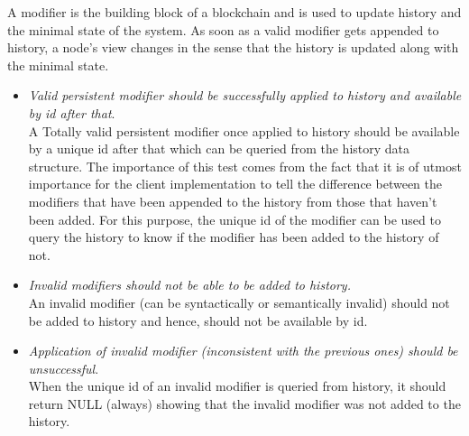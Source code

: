\begin{enumerate}[\IEEEsetlabelwidth{Z}]
A modifier is the building block of a blockchain and is used to update history and the minimal state of the system. As soon as a valid modifier gets appended to history, a node's view changes in the sense that the history is updated along with the minimal state.
\begin{itemize}[]
\item \textit{Valid persistent modifier should be successfully applied to history and available by id after that}.\\
A Totally valid persistent modifier once applied to history should be available by a unique id after that which can be queried from the history data structure. The importance of this test comes from the fact that it is of utmost importance for the client implementation to tell the difference between the modifiers that have been appended to the history from those that haven't been added. For this purpose, the unique id of the modifier can be used to query the history to know if the modifier has been added to the history of not.
\item \textit{Invalid modifiers should not be able to be added to history.}\\
An invalid modifier (can be syntactically or semantically invalid) should not be added to history and hence, should not be available by id.
\item \textit{Application of invalid modifier (inconsistent with the previous ones) should be unsuccessful}.\\
When the unique id of an invalid modifier is queried from history, it should return NULL (always) showing that the invalid modifier was not added to the history.
\end{itemize}


\end{enumerate}
